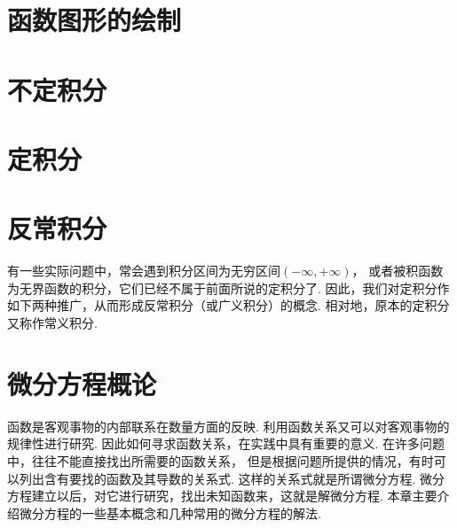\chapter{函数图形的绘制}






\chapter{不定积分}\label{chapter:不定积分}






\chapter{定积分}









\chapter{反常积分}
有一些实际问题中，常会遇到积分区间为无穷区间\((-\infty,+\infty)\)，
或者被积函数为无界函数的积分，它们已经不属于前面所说的定积分了.
因此，我们对定积分作如下两种推广，从而形成反常积分（或广义积分）的概念.
相对地，原本的定积分又称作常义积分.









\chapter{微分方程概论}
函数是客观事物的内部联系在数量方面的反映.
利用函数关系又可以对客观事物的规律性进行研究.
因此如何寻求函数关系，在实践中具有重要的意义.
在许多问题中，往往不能直接找出所需要的函数关系，
但是根据问题所提供的情况，有时可以列出含有要找的函数及其导数的关系式.
这样的关系式就是所谓微分方程.
微分方程建立以后，对它进行研究，找出未知函数来，这就是解微分方程.
本章主要介绍微分方程的一些基本概念和几种常用的微分方程的解法.

